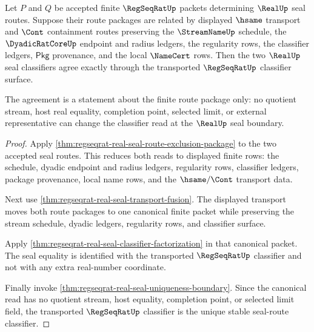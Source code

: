 \begin{theorem}
\label{thm:regseqrat-seal-route-classifier-stability}
Let $P$ and $Q$ be accepted finite $\RegSeqRatUp$ packets determining
$\RealUp$ seal routes. Suppose their route packages are related by displayed
$\hsame$ transport and $\Cont$ containment routes preserving the
$\StreamNameUp$ schedule, the $\DyadicRatCoreUp$ endpoint and radius ledgers,
the regularity rows, the classifier ledgers, $\mathsf{Pkg}$ provenance, and
the local $\NameCert$ rows. Then the two $\RealUp$ seal classifiers agree
exactly through the transported $\RegSeqRatUp$ classifier surface.

The agreement is a statement about the finite route package only: no quotient
stream, host real equality, completion point, selected limit, or external
representative can change the classifier read at the $\RealUp$ seal boundary.
\end{theorem}
\begin{proof}
Apply \autoref{thm:regseqrat-real-seal-route-exclusion-package} to the two
accepted seal routes. This reduces both reads to displayed finite rows: the
schedule, dyadic endpoint and radius ledgers, regularity rows, classifier
ledgers, package provenance, local name rows, and the $\hsame/\Cont$ transport
data.

Next use \autoref{thm:regseqrat-real-seal-transport-fusion}. The displayed
transport moves both route packages to one canonical finite packet while
preserving the stream schedule, dyadic ledgers, regularity rows, and classifier
surface.

Apply \autoref{thm:regseqrat-real-seal-classifier-factorization} in that
canonical packet. The seal equality is identified with the transported
$\RegSeqRatUp$ classifier and not with any extra real-number coordinate.

Finally invoke \autoref{thm:regseqrat-real-seal-uniqueness-boundary}. Since
the canonical read has no quotient stream, host equality, completion point, or
selected limit field, the transported $\RegSeqRatUp$ classifier is the unique
stable seal-route classifier.
\end{proof}


